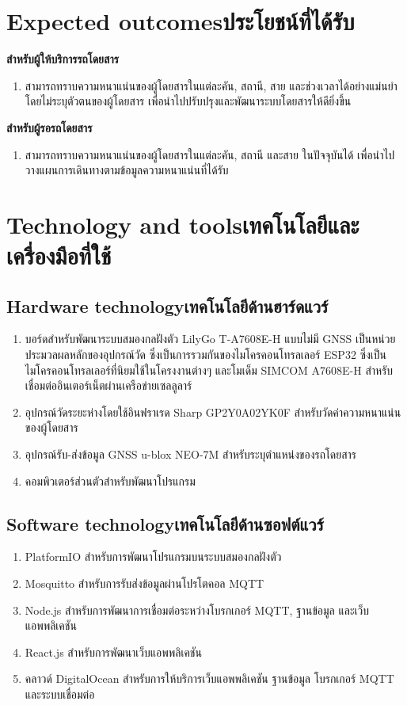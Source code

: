 \section{\ifenglish Expected outcomes\else ประโยชน์ที่ได้รับ\fi}
\textbf{สำหรับผู้ให้บริการรถโดยสาร}
\begin{enumerate}
    \item สามารถทราบความหนาแน่นของผู้โดยสารในแต่ละคัน, สถานี, สาย และช่วงเวลาได้อย่างแม่นยำโดยไม่ระบุตัวตนของผู้โดยสาร เพื่อนำไปปรับปรุงและพัฒนาระบบโดยสารให้ดียิ่งขึ้น
\end{enumerate}
\textbf{สำหรับผู้รอรถโดยสาร}
\begin{enumerate}
    \item สามารถทราบความหนาแน่นของผู้โดยสารในแต่ละคัน, สถานี และสาย ในปัจจุบันได้ เพื่อนำไปวางแผนการเดินทางตามข้อมูลความหนาแน่นที่ได้รับ
\end{enumerate}

\section{\ifenglish Technology and tools\else เทคโนโลยีและเครื่องมือที่ใช้\fi}

\subsection{\ifenglish Hardware technology\else เทคโนโลยีด้านฮาร์ดแวร์\fi}
\begin{enumerate}
    \item บอร์ดสำหรับพัฒนาระบบสมองกลฝังตัว LilyGo T-A7608E-H แบบไม่มี GNSS เป็นหน่วยประมวลผลหลักของอุปกรณ์วัด ซึ่งเป็นการรวมกันของไมโครคอนโทรลเลอร์ ESP32 ซึ่งเป็นไมโครคอนโทรลเลอร์ที่นิยมใช้ในโครงงานต่างๆ และโมเด็ม SIMCOM A7608E-H สำหรับเชื่อมต่ออินเตอร์เน็ตผ่านเครือข่ายเซลลูลาร์ 
    \item อุปกรณ์วัดระยะห่างโดยใช้อินฟราเรด Sharp GP2Y0A02YK0F สำหรับวัดค่าความหนาแน่นของผู้โดยสาร
    \item อุปกรณ์รับ-ส่งข้อมูล GNSS u-blox NEO-7M สำหรับระบุตำแหน่งของรถโดยสาร
    \item คอมพิวเตอร์ส่วนตัวสำหรับพัฒนาโปรแกรม
\end{enumerate}

\subsection{\ifenglish Software technology\else เทคโนโลยีด้านซอฟต์แวร์\fi}
\begin{enumerate}
    \item PlatformIO สำหรับการพัฒนาโปรแกรมบนระบบสมองกลฝังตัว
    \item Mosquitto สำหรับการรับส่งข้อมูลผ่านโปรโตคอล MQTT
    \item Node.js สำหรับการพัฒนาการเชื่อมต่อระหว่างโบรกเกอร์ MQTT, ฐานข้อมูล และเว็บแอพพลิเคชัน
    \item React.js สำหรับการพัฒนาเว็บแอพพลิเคชัน
    \item คลาวด์ DigitalOcean สำหรับการให้บริการเว็บแอพพลิเคชัน ฐานข้อมูล โบรกเกอร์ MQTT และระบบเชื่อมต่อ
\end{enumerate}

